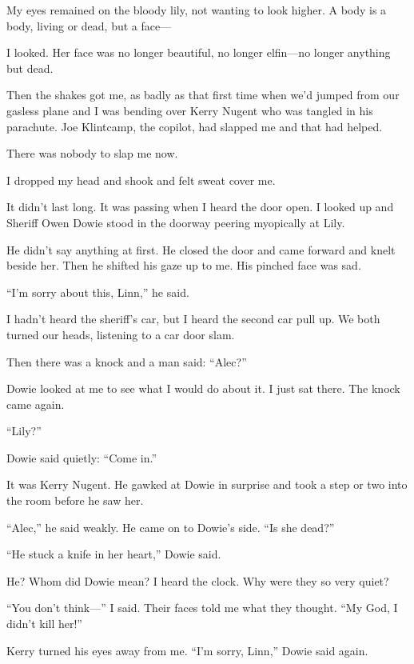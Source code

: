 \documentclass{novel}
\begin{document}
My eyes remained on the bloody lily, not wanting to look higher. A body is a body, living or dead, but a face—

I looked. Her face was no longer beautiful, no longer elfin—no longer anything but dead.

Then the shakes got me, as badly as that first time when we’d jumped from our gasless plane and I was bending over Kerry Nugent who was tangled in his parachute. Joe Klintcamp, the copilot, had slapped me and that had helped. 

There was nobody to slap me now. 

I dropped my head and shook and felt sweat cover me.

It didn’t last long. It was passing when I heard the door open. I looked up and Sheriff Owen Dowie stood in the doorway peering myopically at Lily.

He didn’t say anything at first. He closed the door and came forward and knelt beside her. Then he shifted his gaze up to me. His pinched face was sad.

“I’m sorry about this, Linn,” he said.

I hadn’t heard the sheriff’s car, but I heard the second car pull up. We both turned our heads, listening to a car door slam. 

Then there was a knock and a man said: “Alec?”

Dowie looked at me to see what I would do about it. I just sat there. The knock came again. 

“Lily?” 

Dowie said quietly: “Come in.”

It was Kerry Nugent. He gawked at Dowie in surprise and took a step or two into the room before he saw her. 

“Alec,” he said weakly. He came on to Dowie’s side. “Is she dead?”

“He stuck a knife in her heart,” Dowie said.

He? Whom did Dowie mean? I heard the clock. Why were they so very quiet?

“You don’t think—” I said. Their faces told me what they thought. “My God, I didn’t kill her!”

Kerry turned his eyes away from me. “I’m sorry, Linn,” Dowie said again.

\vspace{2\nbs}
\clearpage
\thispagestyle{empty}
\begin{ChapterStart}
\vspace{3\nbs}
\end{ChapterStart}
\end{document}
